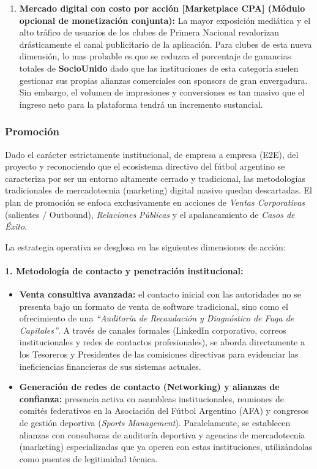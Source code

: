 \begin{enumerate}
  \item \textbf{Mercado digital con costo por acción [Marketplace CPA] (Módulo opcional de monetización conjunta):} La mayor exposición mediática y el alto tráfico de usuarios de los clubes de Primera Nacional revalorizan drásticamente el canal publicitario de la aplicación. Para clubes de esta nueva dimensión, lo mas probable es que se reduzca el porcentaje de ganancias totales de \textbf{SocioUnido} dado que las instituciones de esta categoría suelen gestionar sus propias alianzas comerciales con sponsors de gran envergadura. Sin embargo, el volumen de impresiones y conversiones es tan masivo que el ingreso neto para la plataforma tendrá un incremento sustancial.
\end{enumerate}

\newpage

\subsubsection*{Promoción}

Dado el carácter estrictamente institucional, de empresa a empresa (E2E), del proyecto y reconociendo que el ecosistema directivo del fútbol argentino se caracteriza por ser un entorno altamente cerrado y tradicional, las metodologías tradicionales de mercadotecnia (marketing) digital masivo quedan descartadas. El plan de promoción se enfoca exclusivamente en acciones de \textit{Ventas Corporativas} (salientes / Outbound), \textit{Relaciones Públicas} y el apalancamiento de \textit{Casos de Éxito}.

La estrategia operativa se desglosa en las siguientes dimensiones de acción:

\paragraph{1. Metodología de contacto y penetración institucional:}

\begin{itemize}
    \item \textbf{Venta consultiva avanzada:} el contacto inicial con las autoridades no se presenta bajo un formato de venta de software tradicional, sino como el ofrecimiento de una \textit{``Auditoría de Recaudación y Diagnóstico de Fuga de Capitales''}. A través de canales formales (LinkedIn corporativo, correos institucionales y redes de contactos profesionales), se aborda directamente a los Tesoreros y Presidentes de las comisiones directivas para evidenciar las ineficiencias financieras de sus sistemas actuales.
    \item \textbf{Generación de redes de contacto (Networking) y alianzas de confianza:} presencia activa en asambleas institucionales, reuniones de comités federativos en la Asociación del Fútbol Argentino (AFA) y congresos de gestión deportiva (\textit{Sports Management}). Paralelamente, se establecen alianzas con consultoras de auditoría deportiva y agencias de mercadotecnia (marketing) especializadas que ya operen con estas instituciones, utilizándolas como puentes de legitimidad técnica.
\end{itemize}

